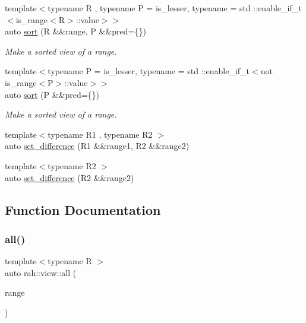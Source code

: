 \begin{DoxyCompactItemize}
{\footnotesize template$<$typename R , typename P  = is\+\_\+lesser, typename  = std \+::enable\+\_\+if\+\_\+t$<$is\+\_\+range$<$\+R$>$\+::value$>$$>$ }\\auto \mbox{\hyperlink{namespacerah_1_1view_a343ff36ca2b6470f2a55a89dfb4e3dc9}{sort}} (R \&\&range, P \&\&pred=\{\})
\begin{DoxyCompactList}\small\item\em Make a sorted view of a range. \end{DoxyCompactList}\item 
{\footnotesize template$<$typename P  = is\+\_\+lesser, typename  = std \+::enable\+\_\+if\+\_\+t$<$not is\+\_\+range$<$\+P$>$\+::value$>$$>$ }\\auto \mbox{\hyperlink{namespacerah_1_1view_aee3389bbe781c123aceb0d017a470e11}{sort}} (P \&\&pred=\{\})
\begin{DoxyCompactList}\small\item\em Make a sorted view of a range. \end{DoxyCompactList}\item 
{\footnotesize template$<$typename R1 , typename R2 $>$ }\\auto \mbox{\hyperlink{namespacerah_1_1view_a84654eafe15215fce621133f069eefc4}{set\+\_\+difference}} (R1 \&\&range1, R2 \&\&range2)
\item 
{\footnotesize template$<$typename R2 $>$ }\\auto \mbox{\hyperlink{namespacerah_1_1view_a8b675093c1b9012369f071f5ba0fbee5}{set\+\_\+difference}} (R2 \&\&range2)
\end{DoxyCompactItemize}


\subsection{Function Documentation}
\mbox{\label{namespacerah_1_1view_acc7f1420accc862d2ac433ba9c697e95}} 
\subsubsection{\texorpdfstring{all()}{all()}\hspace{0.1cm}{\footnotesize\ttfamily [1/2]}}
{\footnotesize\ttfamily template$<$typename R $>$ \\
auto rah\+::view\+::all (\begin{DoxyParamCaption}\item[{R \&\&}]{range }\end{DoxyParamCaption})}



